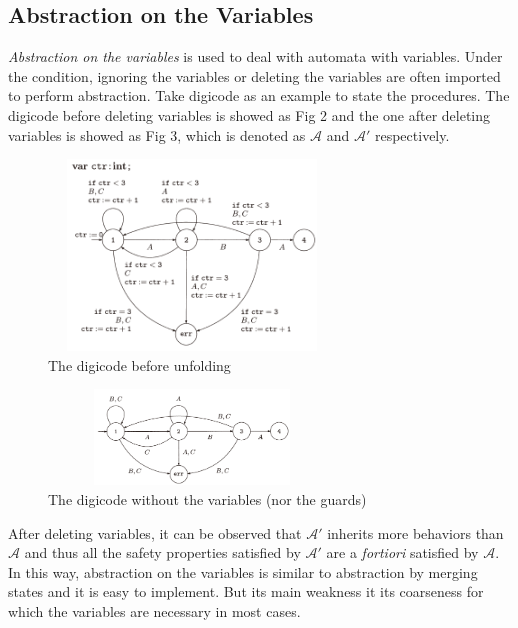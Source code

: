 \documentclass{acmtog} %
\begin{document}
    \subsection{Abstraction on the Variables}
        \quad\textit{Abstraction on the variables} is used to deal with automata with variables. Under the condition, ignoring the variables or deleting the variables are often imported to perform abstraction. Take digicode as an example to state the procedures. The digicode before deleting variables is showed as Fig 2 and the one after deleting variables is showed as Fig 3, which is denoted as $\mathcal{A}$ and $\mathcal{A}'$ respectively.
        \begin{figure}[H]
          \centering
          \includegraphics[width=3.0in, height=2.0in]{2.png}
          \caption{The digicode before unfolding}
        \end{figure}
        \begin{figure}[H]
          \centering
          \includegraphics[width=3.0in, height=1.0in]{3.png}
          \caption{The digicode without the variables (nor the guards)}
        \end{figure}
        After deleting variables, it can be observed that $\mathcal{A}'$ inherits more behaviors than $\mathcal{A}$ and thus all the safety properties satisfied by $\mathcal{A}'$ are a \textit{fortiori} satisfied by $\mathcal{A}$. In this way, abstraction on the variables is similar to abstraction by merging states and it is easy to implement. But its main weakness it its coarseness for which the variables are necessary in most cases.
\end{document}
